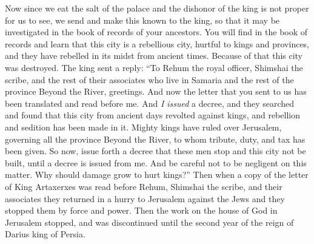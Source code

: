 \begin{biblechapter}
\verse Now since we eat the salt of the palace and the dishonor of the king is not proper for us to see, we send and make this known to the king,
\verse so that it may be investigated in the book of records of your ancestors. You will find in the book of records and learn that this city is a rebellious city, hurtful to kings and provinces, and they have rebelled in its midst from ancient times. Because of that this city was destroyed.
\verse The king sent a reply: “To Rehum the royal officer, Shimshai the scribe, and the rest of their associates who live in Samaria and the rest of the province Beyond the River, greetings. And now
\verse the letter that you sent to us has been translated and read before me.
\verse And \textit{I issued} a decree, and they searched and found that this city from ancient days revolted against kings, and rebellion and sedition has been made in it.
\verse Mighty kings have ruled over Jerusalem, governing all the province Beyond the River, to whom tribute, duty, and tax has been given.
\verse So now, issue forth a decree that these men stop and this city not be built, until a decree is issued from me.
\verse And be careful not to be negligent on this matter. Why should damage grow to hurt kings?”
\verse Then when a copy of the letter of King Artaxerxes was read before Rehum, Shimshai the scribe, and their associates they returned in a hurry to Jerusalem against the Jews and they stopped them by force and power.
\verse Then the work on the house of God in Jerusalem stopped, and was discontinued until the second year of the reign of Darius king of Persia.
\end{biblechapter}

